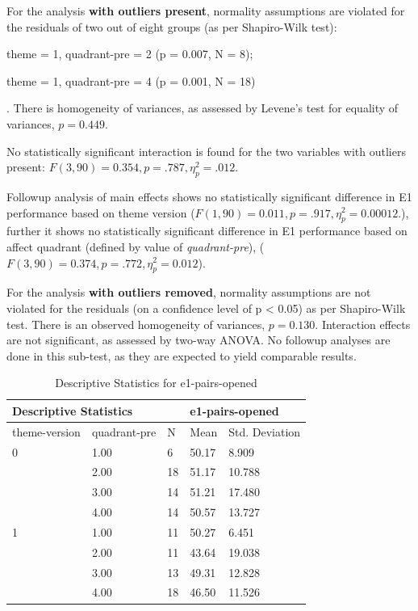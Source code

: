 		For the analysis \textbf{with outliers present}, normality assumptions are violated for the residuals of two out of eight groups (as per Shapiro-Wilk test): 
		\begin{itemize*}
			\item theme = 1, quadrant-pre = 2 (p = 0.007, N = 8);
			\item theme = 1, quadrant-pre = 4 (p = 0.001, N = 18)
		\end{itemize*}. 
		There is homogeneity of variances, as assessed by Levene's test for equality of variances, $ p = 0.449 $.
		
		No statistically significant interaction is found for the two variables with outliers present: 
		$ F(3, 90) = 0.354, p = .787, \eta_{p}^{2} = .012 $.
		
		Followup analysis of main effects shows no statistically significant difference in E1 performance based on theme version ($ F(1, 90) = 0.011, p = .917, \eta_{p}^{2} = 0.00012. $), further it shows no statistically significant difference in E1 performance based on affect quadrant (defined by value of \textit{quadrant-pre}), ($ F(3, 90) = 0.374, p = .772, \eta_{p}^{2} = 0.012 $).
		
		For the analysis \textbf{with outliers removed}, normality assumptions are not violated for the residuals (on a confidence level of p < 0.05) as per Shapiro-Wilk test. There is an observed homogeneity of variances, $ p = 0.130 $. Interaction effects are not significant, as assessed by two-way ANOVA. No followup analyses are done in this sub-test, as they are expected to yield comparable results.

		\begin{table}[]
			\centering
			\begin{tabular}{ll|l|ll}
				\hline
				\multicolumn{2}{l}{Descriptive Statistics}   &    & \multicolumn{2}{l}{e1-pairs-opened} \\ \hline
				theme-version          & quadrant-pre & N  & Mean          & Std. Deviation        \\ \hline
				0                      & 1.00         & 6  & 50.17         & 8.909                 \\
				& 2.00         & 18 & 51.17         & 10.788                \\ 
				& 3.00         & 14 & 51.21         & 17.480                \\ 
				& 4.00         & 14 & 50.57         & 13.727                \\ \hline
				1                      & 1.00         & 11 & 50.27         & 6.451                 \\
				& 2.00         & 11 & 43.64         & 19.038                \\ 
				& 3.00         & 13 & 49.31         & 12.828                \\ 
				& 4.00         & 18 & 46.50         & 11.526                \\ \hline
			\end{tabular}
			\caption{Descriptive Statistics for e1-pairs-opened}
			\label{tbl:group-sized-quadrant-theme-version}
		\end{table}
		

